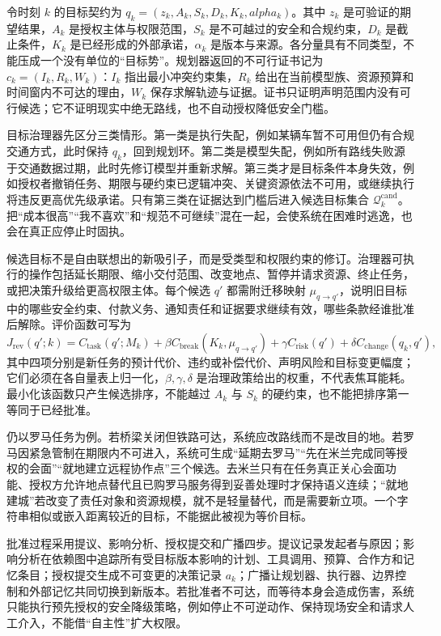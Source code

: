 令时刻 $k$ 的目标契约为 $q_k=(z_k,A_k,S_k,D_k,K_k,alpha_k)$。其中 $z_k$ 是可验证的期望结果，$A_k$ 是授权主体与权限范围，$S_k$ 是不可越过的安全和合规约束，$D_k$ 是截止条件，$K_k$ 是已经形成的外部承诺，$\alpha_k$ 是版本与来源。各分量具有不同类型，不能压成一个没有单位的“目标势”。规划器返回的不可行证书记为 $c_k=(I_k,R_k,W_k)$：$I_k$ 指出最小冲突约束集，$R_k$ 给出在当前模型族、资源预算和时间窗内不可达的理由，$W_k$ 保存求解轨迹与证据。证书只证明声明范围内没有可行候选；它不证明现实中绝无路线，也不自动授权降低安全门槛。

目标治理器先区分三类情形。第一类是执行失配，例如某辆车暂不可用但仍有合规交通方式，此时保持 $q_k$，回到规划环。第二类是模型失配，例如所有路线失败源于交通数据过期，此时先修订模型并重新求解。第三类才是目标条件本身失效，例如授权者撤销任务、期限与硬约束已逻辑冲突、关键资源依法不可用，或继续执行将违反更高优先级承诺。只有第三类在证据达到门槛后进入候选目标集合 $\mathcal Q_k^{\mathrm{cand}}$。把“成本很高”“我不喜欢”和“规范不可继续”混在一起，会使系统在困难时逃逸，也会在真正应停止时固执。

候选目标不是自由联想出的新吸引子，而是受类型和权限约束的修订。治理器可执行的操作包括延长期限、缩小交付范围、改变地点、暂停并请求资源、终止任务，或把决策升级给更高权限主体。每个候选 $q'$ 都需附迁移映射 $\mu_{q\to q'}$，说明旧目标中的哪些安全约束、付款义务、通知责任和证据要求继续有效，哪些条款经谁批准后解除。评价函数可写为
\[
J_{\mathrm{rev}}(q';k)=C_{\mathrm{task}}(q';M_k)+\beta C_{\mathrm{break}}(K_k,\mu_{q\to q'})+\gamma C_{\mathrm{risk}}(q')+\delta C_{\mathrm{change}}(q_k,q'),
\]
其中四项分别是新任务的预计代价、违约或补偿代价、声明风险和目标变更幅度；它们必须在各自量表上归一化，$\beta,\gamma,\delta$ 是治理政策给出的权重，不代表焦耳能耗。最小化该函数只产生候选排序，不能越过 $A_k$ 与 $S_k$ 的硬约束，也不能把排序第一等同于已经批准。

仍以罗马任务为例。若桥梁关闭但铁路可达，系统应改路线而不是改目的地。若罗马因紧急管制在期限内不可进入，系统可生成“延期去罗马”“先在米兰完成同等授权的会面”“就地建立远程协作点”三个候选。去米兰只有在任务真正关心会面功能、授权方允许地点替代且已购罗马服务得到妥善处理时才保持语义连续；“就地建城”若改变了责任对象和资源规模，就不是轻量替代，而是需要新立项。一个字符串相似或嵌入距离较近的目标，不能据此被视为等价目标。

批准过程采用提议、影响分析、授权提交和广播四步。提议记录发起者与原因；影响分析在依赖图中追踪所有受目标版本影响的计划、工具调用、预算、合作方和记忆条目；授权提交生成不可变更的决策记录 $a_k$；广播让规划器、执行器、边界控制和外部记忆共同切换到新版本。若批准者不可达，而等待本身会造成伤害，系统只能执行预先授权的安全降级策略，例如停止不可逆动作、保持现场安全和请求人工介入，不能借“自主性”扩大权限。

